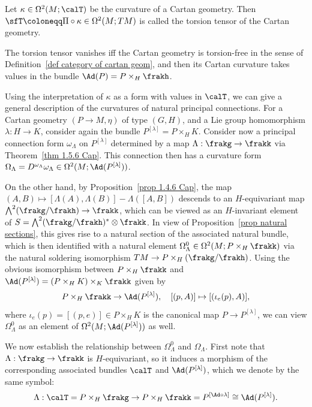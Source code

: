 \begin{defn}
    Let $\kappa\in\Omega^2(M;\calT)$ be the curvature of a Cartan geometry. Then $\sfT\coloneqq \Pi\circ\kappa\in\Omega^2(M;TM)$ is called the torsion tensor of the Cartan geometry.

    The torsion tensor vanishes iff the Cartan geometry is torsion-free in the sense of Definition~\ref{def category of cartan geom}, and then its Cartan curvature takes values in the bundle $\Ad(P)=P\times_H \frakh$.
\end{defn}

Using the interpretation of $\kappa$ as a form with values in $\calT$, we can give a general description of the curvatures of natural principal connections. For a Cartan geometry $(P\to M,\eta)$ of type $(G,H)$, and a Lie group homomorphism $\lambda:H\to K$, consider again the bundle $P^{[\lambda]}=P\times_H K$. Consider now a principal connection form $\omega_\Lambda$ on $P^{[\lambda]}$ determined by a map $\Lambda:\frakg\to\frakk$ via Theorem~\ref{thm 1.5.6 Cap}. This connection then has a curvature form $\Omega_\Lambda=D^{\omega_\Lambda}\omega_\Lambda\in\Omega^2(M;\Ad(P^{[\lambda]}))$.

On the other hand, by Proposition~\ref{prop 1.4.6 Cap}, the map $(A,B)\mapsto [\Lambda(A),\Lambda(B)]-\Lambda([A,B])$ descends to an $H$-equivariant map $\bigwedge^2(\frakg\slash\frakh)\to \frakk$, which can be viewed as an $H$-invariant element of $S=\bigwedge^2(\frakg\slash\frakh)^\ast\otimes\frakk$. In view of Proposition~\ref{prop natural sections}, this gives rise to a natural section of the associated natural bundle, which is then identified with a natural element $\Omega^0_\Lambda\in\Omega^2(M;P\times_H \frakk)$ via the natural soldering isomorphism $TM\to P\times_H(\frakg\slash\frakh)$.  Using the obvious isomorphism between $P\times_H \frakk$ and $\Ad(P^{[\lambda]})=(P\times_H K)\times_K\frakk$ given by 
\[P\times_H \frakk\to \Ad(P^{[\lambda]}),\quad [(p,A)]\mapsto [(\iota_e(p),A)],\]
where $\iota_e(p)=[(p,e)]\in P\times_H K$ is the canonical map $P\to P^{[\lambda]}$, we can view $\Omega^0_\Lambda$ as an element of $\Omega^2(M;\Ad(P^{[\lambda]}))$ as well.

We now establish the relationship between $\Omega^0_\Lambda$ and $\Omega_\Lambda$. First note that $\Lambda:\frakg\to \frakk$ is $H$-equivariant, so it induces a morphism of the corresponding associated bundles $\calT$ and $\Ad(P^{[\lambda]})$, which we denote by the same symbol:
\[\Lambda: \calT=P\times_H\frakg\to P\times_H \frakk =P^{[\Ad\circ \lambda]}\cong \Ad(P^{[\lambda]}).\]


